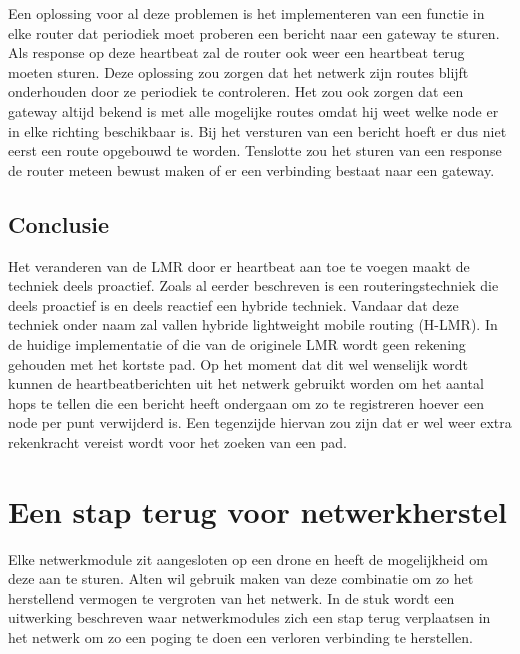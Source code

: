 \documentclass[a4paper, 11pt, oneside]{report}
\begin{document}
Een oplossing voor al deze problemen is het implementeren van een functie in elke router dat periodiek moet proberen een bericht naar een gateway te sturen. Als response op deze heartbeat zal de router ook weer een heartbeat terug moeten sturen.
Deze oplossing zou zorgen dat het netwerk zijn routes blijft onderhouden door ze periodiek te controleren.
Het zou ook zorgen dat een gateway altijd bekend is met alle mogelijke routes omdat hij weet welke node er in elke richting beschikbaar is. Bij het versturen van een bericht hoeft er dus niet eerst een route opgebouwd te worden.
Tenslotte zou het sturen van een response de router meteen bewust maken of er een verbinding bestaat naar een gateway.

\subsection{Conclusie}  

Het veranderen van de LMR door er heartbeat aan toe te voegen maakt de techniek deels proactief. 
Zoals al eerder beschreven is een routeringstechniek die deels proactief is en deels reactief een hybride techniek.
Vandaar dat deze techniek onder naam zal vallen hybride lightweight mobile routing (H-LMR).
In de huidige implementatie of die van de originele LMR wordt geen rekening gehouden met het kortste pad.
Op het moment dat dit wel wenselijk wordt kunnen de heartbeatberichten uit het netwerk gebruikt worden om het aantal hops te tellen die een bericht heeft ondergaan om zo te registreren hoever een node per punt verwijderd is. Een tegenzijde hiervan zou zijn dat er wel weer extra rekenkracht vereist wordt voor het zoeken van een pad.

\section{Een stap terug voor netwerkherstel}\label{sec:drone-aansturing-een-stap-terug-voor-netwerkherstel}

Elke netwerkmodule zit aangesloten op een drone en heeft de mogelijkheid om deze aan te sturen.
Alten wil gebruik maken van deze combinatie om zo het herstellend vermogen te vergroten van het netwerk.
In de stuk wordt een uitwerking beschreven waar netwerkmodules zich een stap terug verplaatsen in het netwerk om zo een poging te doen een verloren verbinding te herstellen.
\end{document}
